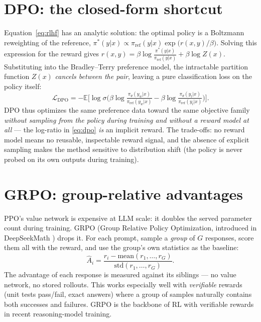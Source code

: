 \documentclass[11pt]{article}
\begin{document}
\section{DPO: the closed-form shortcut}
Equation~\eqref{eq:rlhf} has an analytic solution: the optimal policy is a Boltzmann reweighting of the reference,
$\pi^*(y|x) \propto \pi_\text{ref}(y|x)\exp\!\big(r(x,y)/\beta\big)$.
Solving this expression for the reward gives $r(x,y) = \beta \log \frac{\pi^*(y|x)}{\pi_\text{ref}(y|x)} + \beta\log Z(x)$. Substituting into the Bradley--Terry preference model, the intractable partition function $Z(x)$ \emph{cancels between the pair}, leaving a pure classification loss on the policy itself:
\begin{equation}
\mathcal{L}_\text{DPO} = -\mathbb{E}\Big[ \log \sigma\Big( \beta \log\tfrac{\pi_\theta(y_w|x)}{\pi_\text{ref}(y_w|x)} - \beta \log\tfrac{\pi_\theta(y_l|x)}{\pi_\text{ref}(y_l|x)} \Big) \Big].
\label{eq:dpo}
\end{equation}
DPO \cite{rafailov2023direct} thus optimizes the same preference data toward the same objective family \emph{without sampling from the policy during training and without a reward model at all} --- the log-ratio in \eqref{eq:dpo} \emph{is} an implicit reward. The trade-offs: no reward model means no reusable, inspectable reward signal, and the absence of explicit sampling makes the method sensitive to distribution shift (the policy is never probed on its own outputs during training).

\section{GRPO: group-relative advantages}
PPO's value network is expensive at LLM scale: it doubles the served parameter count during training. GRPO (Group Relative Policy Optimization, introduced in DeepSeekMath \cite{shao2025deepseekmath}) drops it. For each prompt, sample a \emph{group} of $G$ responses, score them all with the reward, and use the group's own statistics as the baseline:
\begin{equation}
\hat{A}_i = \frac{r_i - \mathrm{mean}(r_1,\dots,r_G)}{\mathrm{std}(r_1,\dots,r_G)}.
\end{equation}
The advantage of each response is measured against its siblings --- no value network, no stored rollouts. This works especially well with \emph{verifiable} rewards (unit tests pass/fail, exact answers) where a group of samples naturally contains both successes and failures. GRPO is the backbone of RL with verifiable rewards in recent reasoning-model training.
\end{document}

